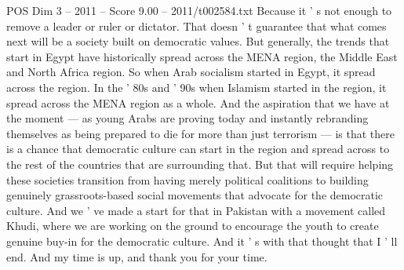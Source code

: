 \begin{textsample}{POS Dim 3 – 2011 – Score 9.00 – 2011/t002584.txt}
Because it ' s not enough to remove a leader or ruler or dictator.
That doesn ' t guarantee that what comes next will be a society built on democratic values.
But generally, the trends that start in Egypt have historically spread across the MENA region, the Middle East and North Africa region.
So when Arab socialism started in Egypt, it spread across the region.
In the ' 80s and ' 90s when Islamism started in the region, it spread across the MENA region as a whole.
And the aspiration that we have at the moment — as young Arabs are proving today and instantly rebranding themselves as being prepared to die for more than just terrorism — is that there is a chance that democratic culture can start in the region and spread across to the rest of the countries that are surrounding that.
But that will require helping these societies transition from having merely political coalitions to building genuinely grassroots-based social movements that advocate for the democratic culture.
And we ' ve made a start for that in Pakistan with a movement called Khudi, where we are working on the ground to encourage the youth to create genuine buy-in for the democratic culture.
And it ' s with that thought that I ' ll end.
And my time is up, and thank you for your time.

\end{textsample}
